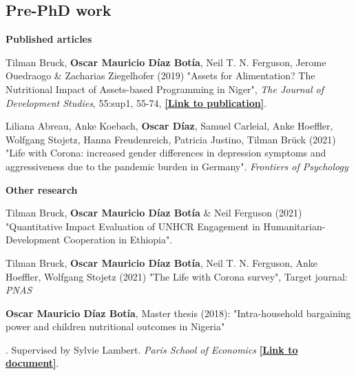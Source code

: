 \documentclass[letterpaper]{article}
\renewenvironment{itemize}{
  \begin{list}{}{
    \setlength{\leftmargin}{1.5em}
  }
}{
  \end{list}
}
\begin{document}
\subsection*{Pre-PhD work}
\textbf{Published articles}
\begin{itemize}
\item Tilman Bruck, \textbf{Oscar Mauricio D\'iaz Bot\'ia}, Neil T. N. Ferguson, Jerome Ouedraogo \& Zacharias Ziegelhofer (2019) "Assets for Alimentation? The Nutritional Impact of Assets-based Programming in Niger", \textit{The Journal of Development Studies}, 55:sup1, 55-74,  \href{https://www.tandfonline.com/doi/full/10.1080/00220388.2019.1687876}{\textbf{ [Link to publication]}}.
\item Liliana Abreau, Anke Koebach, \textbf{Oscar D\'iaz},  Samuel Carleial, Anke Hoeffler, Wolfgang Stojetz, Hanna Freudenreich, Patricia Justino, Tilman Brück (2021) "Life with Corona: increased gender differences in depression symptoms and aggressiveness due to the pandemic burden in Germany". \textit{Frontiers of Psychology} 
\end{itemize}
\textbf{Other research}
\begin{itemize}

{ 
\item Tilman Bruck, \textbf{Oscar Mauricio D\'iaz Bot\'ia} \& Neil Ferguson (2021) "Quantitative Impact Evaluation of UNHCR Engagement in Humanitarian-Development Cooperation in Ethiopia".
 

\item Tilman Bruck, \textbf{Oscar Mauricio D\'iaz Bot\'ia}, Neil T. N. Ferguson, Anke Hoeffler, Wolfgang Stojetz (2021) "The Life with Corona survey", Target journal: \textit{PNAS}  





\item \textbf{Oscar Mauricio D\'iaz Bot\'ia}, Master thesis (2018): "Intra-household bargaining power and children nutritional outcomes in Nigeria"}. Supervised by Sylvie Lambert. \textit{Paris School of Economics} \href{https://drive.google.com/file/d/1x8vZq1nvgypp9I15EvqN-q0D0jSK6NvC/view?usp=sharing}{\textbf{ [Link to document]}}.

\end{itemize}
\end{document}
